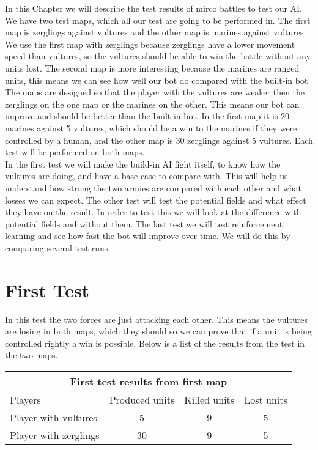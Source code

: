 In this Chapter we will describe the test results of mirco battles to test our AI. We have two test maps, which all our test are going to be performed in. The first map is  zerglings against vultures and the other map is marines against vultures. We use the first map with zerglings because zerglings have a lower movement speed than vultures, so the vultures should be able to win the battle without any units lost. The second map is more interesting because the marines are ranged units, this means we can see how well our bot do compared with the built-in bot. The maps are  designed so that the player with the vultures are weaker then the zerglings on the one map or the marines on the other. This means our bot can improve and should be better than the built-in bot. In the first map it is 20 marines against 5 vultures, which should be a win to the marines if they were controlled by a human, and the other map is 30 zerglings against 5 vultures. Each test will be performed on both maps. \\

In the first test we will make the build-in AI fight itself, to know how the vultures are doing, and have a base case to compare with. This will help us understand how strong the two armies are compared with each other and what losses we can expect. The other test will test the potential fields and what effect they have on the result.
In order to test this we will look at the difference with potential fields and without them. The last test we will test reinforcement learning and see how fast the bot will improve over time. We will do this by comparing several test runs.

\section{First Test}
In this test the two forces are just attacking each other. This means the vultures are losing in both maps, which they should so we can prove that if a unit is being controlled rightly a win is possible. Below is a list of the results from the test
in the two maps.

\begin{centering}
 \begin{tabular}{|l||c|c|c|}
	\multicolumn{5}{c}{First test results from first map} \\
	\hline
	Players & Produced units & Killed units & Lost units\\
	\hline
	\hline
		Player with vultures & 5 & 9 & 5 \\
	\hline
		Player with zerglings & 30 & 9 & 5\\
	\hline

\end{tabular}
\end{centering}

